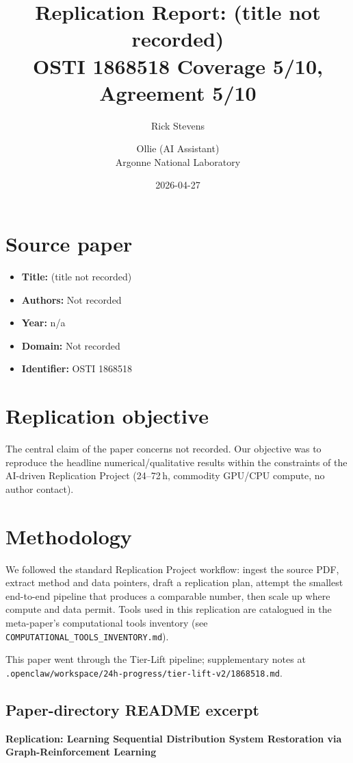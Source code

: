 \documentclass[11pt]{article}
\title{Replication Report: (title not recorded)\\[2pt]\large OSTI 1868518 \textbar{} Coverage 5/10, Agreement 5/10}
\author{Rick Stevens \and Ollie (AI Assistant)\\\small Argonne National Laboratory}
\date{2026-04-27}
\begin{document}
\maketitle

\section{Source paper}
\begin{itemize}
\item \textbf{Title:} (title not recorded)
\item \textbf{Authors:} Not recorded
\item \textbf{Year:} n/a
\item \textbf{Domain:} Not recorded
\item \textbf{Identifier:} OSTI 1868518
\end{itemize}


\section{Replication objective}
The central claim of the paper concerns not recorded. Our objective was to reproduce the headline numerical/qualitative results within the constraints of the AI-driven Replication Project (24--72\,h, commodity GPU/CPU compute, no author contact). 

\section{Methodology}
We followed the standard Replication Project workflow: ingest the source PDF, extract method and data pointers, draft a replication plan, attempt the smallest end-to-end pipeline that produces a comparable number, then scale up where compute and data permit. Tools used in this replication are catalogued in the meta-paper's computational tools inventory (see \texttt{COMPUTATIONAL\_TOOLS\_INVENTORY.md}).

This paper went through the Tier-Lift pipeline; supplementary notes at \texttt{.openclaw/workspace/24h-progress/tier-lift-v2/1868518.md}.

\subsection*{Paper-directory README excerpt}
\small
\par\medskip\textbf{Replication: Learning Sequential Distribution System Restoration via Graph-Reinforcement Learning}\par
\end{document}
